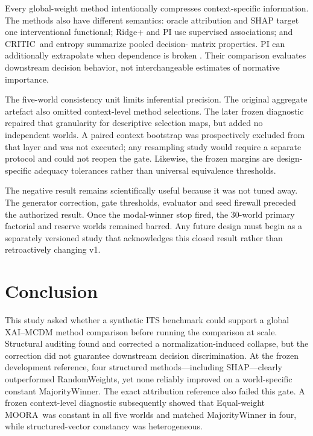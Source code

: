 \documentclass[runningheads]{llncs}
\newcommand{\MOORA}{MOORA}
\newcommand{\CRITIC}{CRITIC}
\begin{document}
Every global-weight method intentionally compresses context-specific information. The methods
also have different semantics: oracle attribution and SHAP target one interventional functional;
Ridge+ and PI use supervised associations; and \CRITIC\ and entropy summarize pooled decision-
matrix properties. PI can additionally extrapolate when dependence is broken
\cite{hooker2021permutation}. Their comparison evaluates downstream decision behavior, not
interchangeable estimates of normative importance.

The five-world consistency unit limits inferential precision. The original aggregate artefact
also omitted context-level method selections. The later frozen diagnostic repaired that
granularity for descriptive selection maps, but added no independent worlds. A paired context
bootstrap was prospectively excluded from that layer and was not executed; any resampling study
would require a separate protocol and could not reopen the gate. Likewise, the frozen margins
are design-specific adequacy tolerances rather than universal equivalence thresholds.

The negative result remains scientifically useful because it was not tuned away. The generator
correction, gate thresholds, evaluator and seed firewall preceded the authorized result. Once
the modal-winner stop fired, the 30-world primary factorial and reserve worlds remained barred.
Any future design must begin as a separately versioned study that acknowledges this closed
result rather than retroactively changing v1.

\section{Conclusion}
\label{sec:conclusion}

This study asked whether a synthetic ITS benchmark could support a global XAI--MCDM method
comparison before running the comparison at scale. Structural auditing found and corrected a
normalization-induced collapse, but the correction did not guarantee downstream decision
discrimination. At the frozen development reference, four structured methods---including
SHAP---clearly outperformed RandomWeights, yet none reliably improved on a world-specific
constant MajorityWinner. The exact attribution reference also failed this gate. A frozen
context-level diagnostic subsequently showed that Equal-weight \MOORA\ was constant in all five
worlds and matched MajorityWinner in four, while structured-vector constancy was heterogeneous.
\end{document}
